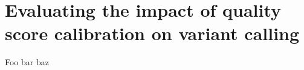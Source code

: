 \chapter{Evaluating the impact of quality score calibration on variant calling}

Foo bar baz \parencite{krusche_best_2018}

